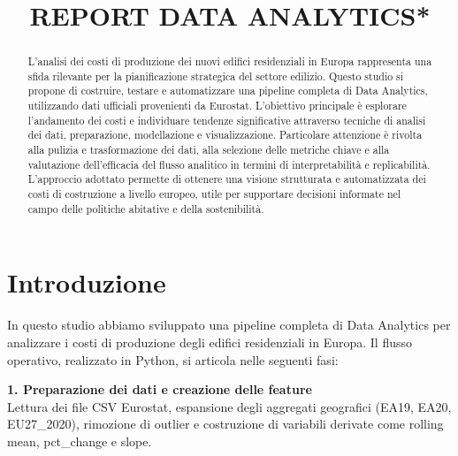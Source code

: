 \documentclass[conference]{IEEEtran}
\begin{document}
\title{REPORT DATA ANALYTICS*\\}



\author{}






\maketitle
\begin{abstract}
    L’analisi dei costi di produzione dei nuovi edifici residenziali in Europa rappresenta una sfida rilevante per la pianificazione strategica del settore edilizio. Questo studio si propone di costruire, testare e automatizzare una pipeline completa di Data Analytics, utilizzando dati ufficiali provenienti da Eurostat. L’obiettivo principale è esplorare l’andamento dei costi e individuare tendenze significative attraverso tecniche di analisi dei dati, preparazione, modellazione e visualizzazione. Particolare attenzione è rivolta alla pulizia e trasformazione dei dati, alla selezione delle metriche chiave e alla valutazione dell’efficacia del flusso analitico in termini di interpretabilità e replicabilità. L’approccio adottato permette di ottenere una visione strutturata e automatizzata dei costi di costruzione a livello europeo, utile per supportare decisioni informate nel campo delle politiche abitative e della sostenibilità.
\end{abstract}

\section*{\LARGE\textbf{Introduzione}}




In questo studio abbiamo sviluppato una pipeline completa di Data Analytics per analizzare i costi di produzione degli edifici residenziali in Europa. Il flusso operativo, realizzato in Python, si articola nelle seguenti fasi:

\vspace{1em}

{\large \textbf{1. Preparazione dei dati e creazione delle feature}}\\
{\small Lettura dei file CSV Eurostat, espansione degli aggregati geografici (EA19, EA20, EU27\_2020), rimozione di outlier e costruzione di variabili derivate come rolling mean, pct\_change e slope.}
\end{document}
